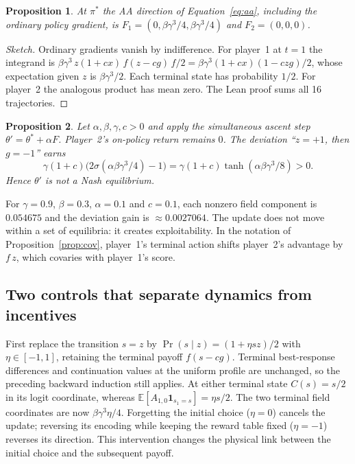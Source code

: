 \documentclass[11pt]{article}
\newtheorem{proposition}{Proposition}
\theoremstyle{remark}
\newcommand{\E}{\mathbb{E}}
\begin{document}
\begin{proposition}\label{prop:field}
At $\pi^*$ the AA direction of Equation~\eqref{eq:aa}, including the ordinary policy gradient, is $F_1=(0,\beta\gamma^3/4,\beta\gamma^3/4)$ and $F_2=(0,0,0)$.
\end{proposition}
\begin{proof}[Sketch]
Ordinary gradients vanish by indifference. For player~1 at $t=1$ the integrand is $\beta\gamma^3\,z(1+cx)\,f(z-cg)\,f/2=\beta\gamma^3(1+cx)(1-czg)/2$, whose expectation given $z$ is $\beta\gamma^3/2$. Each terminal state has probability $1/2$. For player~2 the analogous product has mean zero. The Lean proof sums all 16 trajectories.
\end{proof}

\begin{proposition}\label{prop:dev}
Let $\alpha,\beta,\gamma,c>0$ and apply the simultaneous ascent step $\theta'=\theta^*+\alpha F$. Player~2's on-policy return remains $0$. The deviation ``$z=+1$, then $g=-1$'' earns
\[
\gamma(1+c)\big(2\sigma(\alpha\beta\gamma^3/4)-1\big)=\gamma(1+c)\tanh(\alpha\beta\gamma^3/8)>0 .
\]
Hence $\theta'$ is not a Nash equilibrium.
\end{proposition}

For $\gamma=0.9$, $\beta=0.3$, $\alpha=0.1$ and $c=0.1$, each nonzero field component is $0.054675$ and the deviation gain is $\approx 0.0027064$. The update does not move within a set of equilibria: it creates exploitability. In the notation of Proposition~\ref{prop:cov}, player~1's terminal action shifts player~2's advantage by $f\,z$, which covaries with player~1's score.

\subsection{Two controls that separate dynamics from incentives}
First replace the transition $s=z$ by $\Pr(s\mid z)=(1+\eta s z)/2$ with $\eta\in[-1,1]$, retaining the terminal payoff $f(s-cg)$. Terminal best-response differences and continuation values at the uniform profile are unchanged, so the preceding backward induction still applies. At either terminal state $C(s)=s/2$ in its logit coordinate, whereas $\E[A_{1,0}\mathbf{1}_{s_1=s}]=\eta s/2$. The two terminal field coordinates are now $\beta\gamma^3\eta/4$. Forgetting the initial choice ($\eta=0$) cancels the update; reversing its encoding while keeping the reward table fixed ($\eta=-1$) reverses its direction. This intervention changes the physical link between the initial choice and the subsequent payoff.
\end{document}
